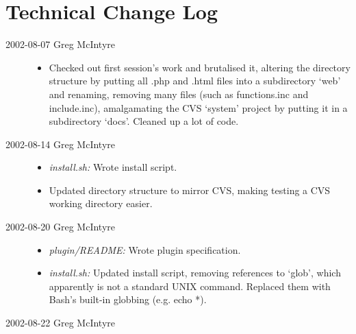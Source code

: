 \documentclass{article}
\begin{document}
\section{Technical Change Log}

\begin{description}

\item[2002-08-07 Greg McIntyre]\hspace{0em}

\begin{itemize}

\item Checked out first session's work and brutalised it, altering the directory structure by putting all .php and .html files into a subdirectory `web' and renaming, removing many files (such as functions.inc and include.inc), amalgamating the CVS `system' project by putting it in a subdirectory `docs'. Cleaned up a lot of code. 

\end{itemize}

\item[2002-08-14 Greg McIntyre]\hspace{0em}

\begin{itemize}

\item \textit{install.sh:} Wrote install script.
\item Updated directory structure to mirror CVS, making testing a CVS working directory easier. 

\end{itemize}

\item[2002-08-20 Greg McIntyre]\hspace{0em}

\begin{itemize}

\item \textit{plugin/README:} Wrote plugin specification.
\item \textit{install.sh:} Updated install script, removing references to `glob', which apparently is not a standard UNIX command. Replaced them with Bash's built-in globbing (e.g. echo *).

\end{itemize}

\item[2002-08-22 Greg McIntyre]\hspace{0em}


\end{description}
\end{document}

